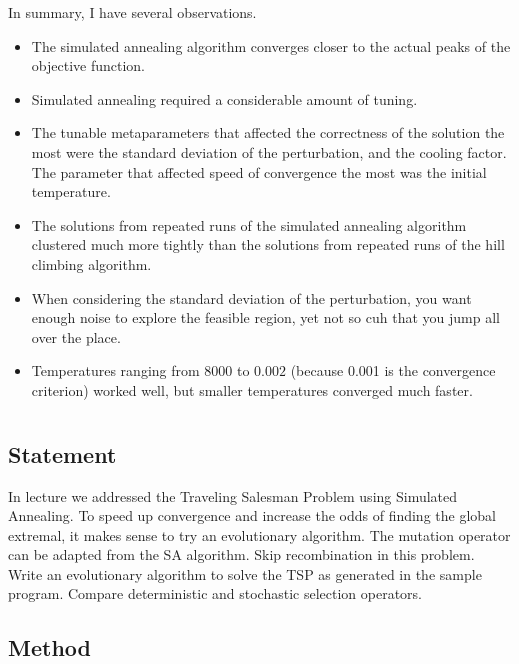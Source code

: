 \documentclass{article}
\begin{document}
In summary, I have several observations.
\begin{itemize}
    \item The simulated annealing algorithm converges closer to the actual peaks of the objective
          function.
    \item Simulated annealing required a considerable amount of tuning.
    \item The tunable metaparameters that affected the correctness of the solution the most were
          the standard deviation of the perturbation, and the cooling factor. The parameter that
          affected speed of convergence the most was the initial temperature.
    \item The solutions from repeated runs of the simulated annealing algorithm clustered much more
          tightly than the solutions from repeated runs of the hill climbing algorithm.
    \item When considering the standard deviation of the perturbation, you want enough noise to
          explore the feasible region, yet not so cuh that you jump all over the place.
    \item Temperatures ranging from $8000$ to $0.002$ (because 0.001 is the convergence criterion)
          worked well, but smaller temperatures converged much faster.
\end{itemize}

\section{}\label{prob:2}
\subsection{Statement}
In lecture we addressed the Traveling Salesman Problem using Simulated Annealing. To speed up
convergence and increase the odds of finding the global extremal, it makes sense to try an
evolutionary algorithm. The mutation operator can be adapted from the SA algorithm. Skip
recombination in this problem. Write an evolutionary algorithm to solve the TSP as generated in the
sample program. Compare deterministic and stochastic selection operators.

\subsection{Method}
\end{document}
